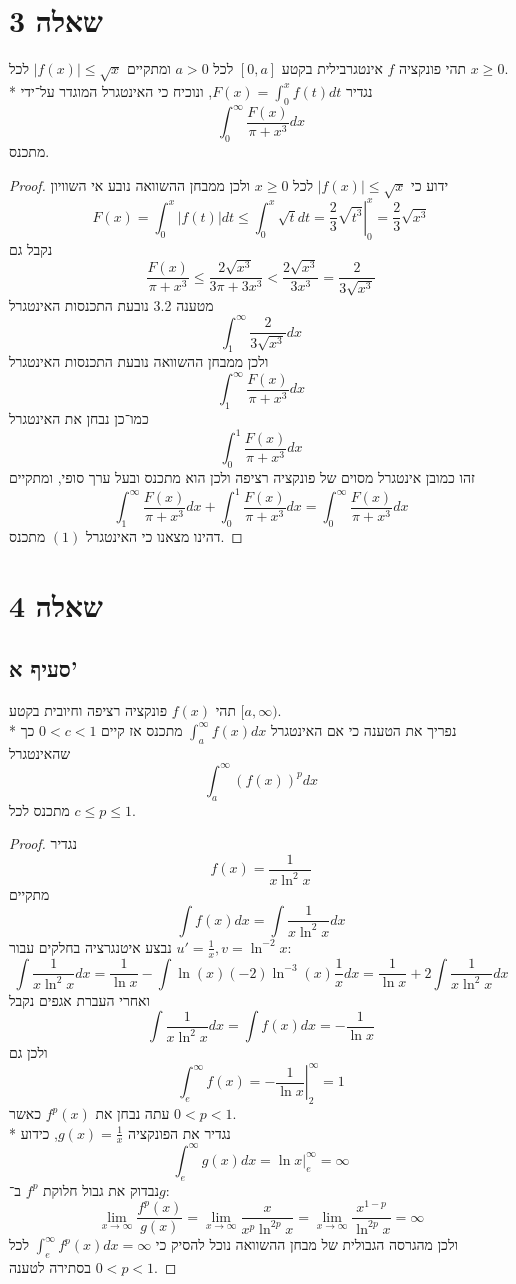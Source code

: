 \section{שאלה 3}
תהי פונקציה $f$ אינטגרבילית בקטע $[0, a]$ לכל $a > 0$ ומתקיים $\lvert f(x) \rvert \le \sqrt{x}$ לכל $x \ge 0$. \\*
נגדיר $F(x) = \int_0^x f(t) dt$, ונוכיח כי האינטגרל המוגדר על־ידי
\[
	\int_0^\infty \frac{F(x)}{\pi + x^3} dx \tag{1}
\]
מתכנס.
\begin{proof}
	ידוע כי $\lvert f(x) \rvert \le \sqrt{x}$ לכל $x \ge 0$ ולכן ממבחן ההשוואה נובע אי השוויון
	\[
		F(x) = \int_0^x \lvert f(t) \rvert dt \le \int_0^x \sqrt{t} dt = \left. \frac{2}{3} \sqrt{t^3} \right|_0^x = \frac{2}{3} \sqrt{x^3}
	\]
	נקבל גם
	\[
		\frac{F(x)}{\pi + x^3}
		\le \frac{2 \sqrt{x^3}}{3 \pi + 3 x^3}
		< \frac{2 \sqrt{x^3}}{3 x^3}
		= \frac{2}{3 \sqrt{x^3}}
		\tag{2}
	\]
	מטענה 3.2 נובעת התכנסות האינטגרל
	\[
		\int_{1}^{\infty} \frac{2}{3 \sqrt{x^3}} dx
	\]
	ולכן ממבחן ההשוואה נובעת התכנסות האינטגרל
	\[
		\int_1^\infty \frac{F(x)}{\pi + x^3} dx
	\]
	כמו־כן נבחן את האינטגרל
	\[
		\int_0^1 \frac{F(x)}{\pi + x^3} dx
	\]
	זהו כמובן אינטגרל מסוים של פונקציה רציפה ולכן הוא מתכנס ובעל ערך סופי, ומתקיים
	\[
		\int_1^\infty \frac{F(x)}{\pi + x^3} dx + \int_0^1 \frac{F(x)}{\pi + x^3} dx
		= \int_0^\infty \frac{F(x)}{\pi + x^3} dx
	\]
	דהינו מצאנו כי האינטגרל $(1)$ מתכנס.
\end{proof}

\section{שאלה 4}
\subsection{סעיף א'}
תהי $f(x)$ פונקציה רציפה וחיובית בקטע $[a, \infty)$. \\* %
נפריך את הטענה כי אם האינטגרל $\int_a^\infty f(x) dx$ מתכנס אז קיים $0 < c < 1$ כך שהאינטגרל
\[
	\int_a^\infty {(f(x))}^p dx
\]
מתכנס לכל $c \le p \le 1$.
\begin{proof}
	נגדיר
	\[
		f(x) = \frac{1}{x \ln^2 x}
	\]
	מתקיים
	\[
		\int f(x) dx
		= \int \frac{1}{x \ln^2 x} dx
	\]
	נבצע איטנגרציה בחלקים עבור $u' = \frac{1}{x}, v = \ln^{-2}x$:
	\[
		\int \frac{1}{x \ln^2 x} dx
		= \frac{1}{\ln x} - \int \ln(x) (-2) \ln^{-3}(x) \frac{1}{x} dx
		= \frac{1}{\ln x} + 2\int \frac{1}{x \ln^2 x} dx
	\]
	ואחרי העברת אגפים נקבל
	\[
		\int \frac{1}{x \ln^2 x} dx = \int f(x) dx = -\frac{1}{\ln x}
	\]
	ולכן גם
	\[
		\int_{e}^{\infty} f(x) = \left. -\frac{1}{\ln x} \right|_2^\infty = 1
	\]
	עתה נבחן את $f^p(x)$ כאשר $0 < p < 1$. \\*
	נגדיר את הפונקציה $g(x) = \frac{1}{x}$, כידוע
	\[
		\int_{e}^{\infty} g(x) dx = \left. \ln x \right|_e^\infty = \infty
	\]
	נבדוק את גבול חלוקת $f^p$ ב־$g$:
	\[
		\lim_{x \to \infty} \frac{f^p(x)}{g(x)}
		= \lim_{x \to \infty} \frac{x}{x^p \ln^{2p} x}
		= \lim_{x \to \infty} \frac{x^{1 - p}}{\ln^{2p} x}
		= \infty
	\]
	ולכן מהגרסה הגבולית של מבחן ההשוואה נוכל להסיק כי $\int_e^\infty f^p(x) dx = \infty$ לכל $0 < p < 1$ בסתירה לטענה.
\end{proof}

